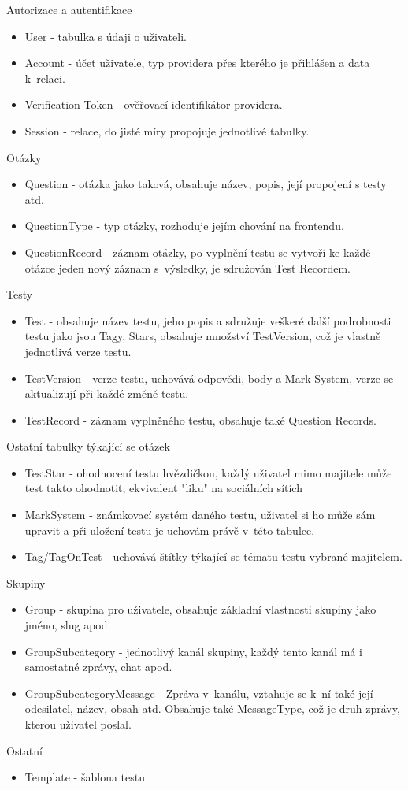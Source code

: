 \documentclass[12pt, a4paper,
openright
]{report}
\begin{document}
Autorizace a autentifikace
\begin{itemize}
	\item User - tabulka s údaji o uživateli.
	\item Account - účet uživatele, typ providera přes kterého je přihlášen a data k~relaci.
	\item Verification Token - ověřovací identifikátor providera.
	\item Session - relace, do jisté míry propojuje jednotlivé tabulky.
\end{itemize} 
Otázky
\begin{itemize}
	\item Question - otázka jako taková, obsahuje název, popis, její propojení s testy atd.
	\item QuestionType - typ otázky, rozhoduje jejím chování na frontendu.
	\item QuestionRecord - záznam otázky, po vyplnění testu se vytvoří ke každé otázce jeden nový záznam s~výsledky, je sdružován Test Recordem.
\end{itemize}
Testy
\begin{itemize}
	\item Test - obsahuje název testu, jeho popis a sdružuje veškeré další podrobnosti testu jako jsou Tagy, Stars, obsahuje množství TestVersion, což je vlastně jednotlivá verze testu.
	\item TestVersion - verze testu, uchovává odpovědi, body a Mark System, verze se aktualizují při každé změně testu.
	\item TestRecord - záznam vyplněného testu, obsahuje také Question Records.
\end{itemize}
Ostatní tabulky týkající se otázek
\begin{itemize}
	\item TestStar - ohodnocení testu hvězdičkou, každý uživatel mimo majitele může test takto ohodnotit, ekvivalent "liku" na sociálních sítích
	\item MarkSystem - známkovací systém daného testu, uživatel si ho může sám upravit a při uložení testu je uchovám právě v~této tabulce.
	\item Tag/TagOnTest - uchovává štítky týkající se tématu testu vybrané majitelem.
\end{itemize}
Skupiny
\begin{itemize}
	\item Group - skupina pro uživatele, obsahuje základní vlastnosti skupiny jako jméno, slug apod.
	\item GroupSubcategory - jednotlivý kanál skupiny, každý tento kanál má i samostatné zprávy, chat apod.
	\item GroupSubcategoryMessage - Zpráva v~kanálu, vztahuje se k~ní také její odesilatel, název, obsah atd. Obsahuje také MessageType, což je druh zprávy, kterou uživatel poslal.
\end{itemize}
Ostatní
\begin{itemize}
	\item Template - šablona testu
\end{itemize}
\end{document}
